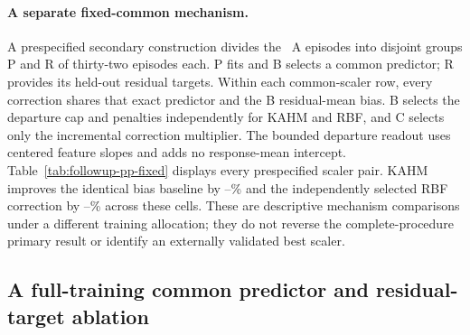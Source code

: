 \begin{table}[t]
\centering\small
\caption{Preprocessing follow-up: original four-claim family.
$L_c,L_m$ are mean repetition SMSEs; gain is
$100(1-L_c/L_m)$. The first three claims require 3\% superiority and
the last permits 5\% linear-control excess loss. ``Lower gap'' is the
Bonferroni one-sided paired-$t$ endpoint over \PPRepetitions\ repetitions;
a positive endpoint establishes the stated claim.}
\label{tab:followup-pp-primary}

\end{table}

\paragraph{A separate fixed-common mechanism.}
A prespecified secondary construction divides the
\PPEpisodesA\ A episodes into disjoint groups P and R of thirty-two
episodes each. P fits and B selects a common predictor; R provides its
held-out residual targets. Within each common-scaler row, every correction
shares that exact predictor and the B residual-mean bias. B selects the
departure cap and penalties independently for KAHM and RBF, and C selects
only the incremental correction multiplier. The bounded departure readout
uses centered feature slopes and adds no response-mean intercept.
Table~\ref{tab:followup-pp-fixed} displays every prespecified scaler pair.
KAHM improves the identical bias baseline by
\PPFixedBiasGainMin--\PPFixedBiasGainMax\% and the independently selected
RBF correction by \PPFixedRBFGainMin--\PPFixedRBFGainMax\% across these
cells. These are descriptive mechanism comparisons under a different
training allocation; they do not reverse the complete-procedure primary
result or identify an externally validated best scaler.

\begin{table}[t]
\centering\small
\caption{Preprocessing follow-up's separate P/R fixed-common experiment:
all five prespecified scaler cells, nonlinear calibrated SMSE.
``Bias'' is the frozen common forecast plus its shared B bias. KAHM and
RBF independently select their departure caps and penalties. Percent gains
compare KAHM with the indicated within-row baseline; every result here is
secondary and descriptive. Different common-scaler rows fit different
common predictors.}
\label{tab:followup-pp-fixed}

\end{table}

\subsection{A full-training common predictor and residual-target ablation}

